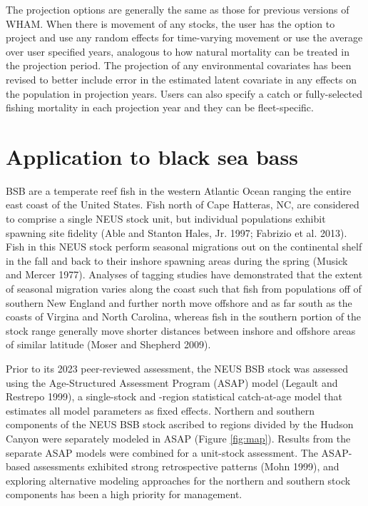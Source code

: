 \documentclass[
]{article}
\begin{document}
The projection options are generally the same as those for previous versions of WHAM. When there is movement of any stocks, the user has the option to project and use any random effects for time-varying movement or use the average over user specified years, analogous to how natural mortality can be treated in the projection period. The projection of any environmental covariates has been revised to better include error in the estimated latent covariate in any effects on the population in projection years. Users can also specify a catch or fully-selected fishing mortality in each projection year and they can be fleet-specific.

\hypertarget{application-to-black-sea-bass}{%
\section*{Application to black sea bass}\label{application-to-black-sea-bass}}

BSB are a temperate reef fish in the western Atlantic Ocean ranging the entire east coast of the United States. Fish north of Cape Hatteras, NC, are considered to comprise a single NEUS stock unit, but individual populations exhibit spawning site fidelity (Able and Stanton Hales, Jr. 1997; Fabrizio et al. 2013). Fish in this NEUS stock perform seasonal migrations out on the continental shelf in the fall and back to their inshore spawning areas during the spring (Musick and Mercer 1977). Analyses of tagging studies have demonstrated that the extent of seasonal migration varies along the coast such that fish from populations off of southern New England and further north move offshore and as far south as the coasts of Virgina and North Carolina, whereas fish in the southern portion of the stock range generally move shorter distances between inshore and offshore areas of similar latitude (Moser and Shepherd 2009).

Prior to its 2023 peer-reviewed assessment, the NEUS BSB stock was assessed using the Age-Structured Assessment Program (ASAP) model (Legault and Restrepo 1999), a single-stock and -region statistical catch-at-age model that estimates all model parameters as fixed effects. Northern and southern components of the NEUS BSB stock ascribed to regions divided by the Hudson Canyon were separately modeled in ASAP (Figure \ref{fig:map}). Results from the separate ASAP models were combined for a unit-stock assessment. The ASAP-based assessments exhibited strong retrospective patterns (Mohn 1999), and exploring alternative modeling approaches for the northern and southern stock components has been a high priority for management.
\end{document}
